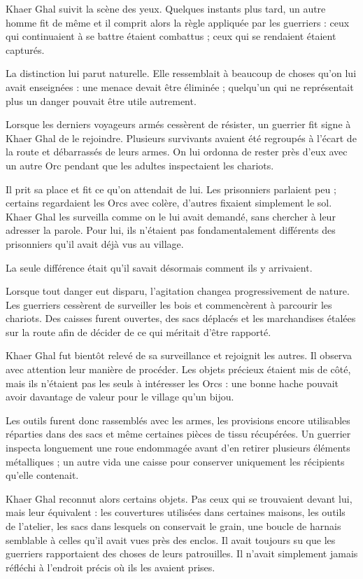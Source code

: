Khaer Ghal suivit la scène des yeux. Quelques instants plus tard, un autre
homme fit de même et il comprit alors la règle appliquée par les guerriers :
ceux qui continuaient à se battre étaient combattus ; ceux qui se rendaient
étaient capturés.

La distinction lui parut naturelle. Elle ressemblait à beaucoup de choses qu'on
lui avait enseignées : une menace devait être éliminée ; quelqu'un qui ne
représentait plus un danger pouvait être utile autrement.

Lorsque les derniers voyageurs armés cessèrent de résister, un guerrier fit
signe à Khaer Ghal de le rejoindre. Plusieurs survivants avaient été regroupés
à l'écart de la route et débarrassés de leurs armes. On lui ordonna de rester
près d'eux avec un autre Orc pendant que les adultes inspectaient les chariots.

Il prit sa place et fit ce qu'on attendait de lui. Les prisonniers parlaient
peu ; certains regardaient les Orcs avec colère, d'autres fixaient simplement
le sol. Khaer Ghal les surveilla comme on le lui avait demandé, sans chercher
à leur adresser la parole. Pour lui, ils n'étaient pas fondamentalement
différents des prisonniers qu'il avait déjà vus au village.

La seule différence était qu'il savait désormais comment ils y arrivaient.

\scenebreak

Lorsque tout danger eut disparu, l'agitation changea progressivement de nature.
Les guerriers cessèrent de surveiller les bois et commencèrent à parcourir les
chariots. Des caisses furent ouvertes, des sacs déplacés et les marchandises
étalées sur la route afin de décider de ce qui méritait d'être rapporté.

Khaer Ghal fut bientôt relevé de sa surveillance et rejoignit les autres. Il
observa avec attention leur manière de procéder. Les objets précieux étaient
mis de côté, mais ils n'étaient pas les seuls à intéresser les Orcs : une bonne
hache pouvait avoir davantage de valeur pour le village qu'un bijou.

Les outils furent donc rassemblés avec les armes, les provisions encore
utilisables réparties dans des sacs et même certaines pièces de tissu
récupérées. Un guerrier inspecta longuement une roue endommagée avant d'en
retirer plusieurs éléments métalliques ; un autre vida une caisse pour
conserver uniquement les récipients qu'elle contenait.

Khaer Ghal reconnut alors certains objets. Pas ceux qui se trouvaient devant
lui, mais leur équivalent : les couvertures utilisées dans certaines maisons,
les outils de l'atelier, les sacs dans lesquels on conservait le grain, une
boucle de harnais semblable à celles qu'il avait vues près des enclos. Il avait
toujours su que les guerriers rapportaient des choses de leurs patrouilles. Il
n'avait simplement jamais réfléchi à l'endroit précis où ils les avaient
prises.

